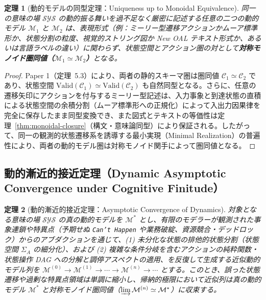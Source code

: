 \documentclass[11pt,a4paper]{ltjsarticle}
\theoremstyle{definition}
\theoremstyle{plain}
\newtheorem{theorem}{定理}[section]
\theoremstyle{remark}
\newcommand{\Valid}{\mathrm{Valid}}
\begin{document}
\begin{theorem}[動的モデルの同型定理：Uniqueness up to Monoidal Equivalence]\label{thm:dyn-iso}
同一の意味の場 $\mathcal{SYS}$ の動的振る舞いを過不足なく厳密に記述する任意の二つの動的モデル $\mathcal{M}_1$ と $\mathcal{M}_2$ は、表現形式（例：ミーリー型遷移アクションかムーア標準形か、状態分割の粒度、視覚的ストリング図か New OAL テキスト形式か、あるいは言語ラベルの違い）に関わらず、状態空間とアクション圏の対として\textbf{対称モノイド圏同値（$\mathcal{M}_1 \simeq \mathcal{M}_2$）}となる。
\end{theorem}

\begin{proof}
Paper 1（定理~5.3）により、両者の静的スキーマ圏は圏同値 $\mathcal{C}_1 \simeq \mathcal{C}_2$ であり、状態空間 $\Valid(\mathcal{C}_1) \simeq \Valid(\mathcal{C}_2)$ も自然同型となる。さらに、任意の遷移矢印にアクションを付与するミーリー型記述は、入力事象と到達状態の直積による状態空間の余積分割（ムーア標準形への正規化）によって入出力因果律を完全に保存したまま同型変換でき、また図式とテキストの等価性は定理~\ref{thm:monoidal-closure}（構文・意味論同型）により保証される。したがって、同一の観測的状態遷移系を誘導する最小実現（Minimal Realization）の普遍性により、両者の動的モデル圏は対称モノイド関手によって圏同値となる。
\end{proof}

\subsection{動的漸近的接近定理（Dynamic Asymptotic Convergence under Cognitive Finitude）}

\begin{theorem}[動的漸近的接近定理：Asymptotic Convergence of Dynamics]\label{thm:dyn-conv}
対象となる意味の場 $\mathcal{SYS}$ の真の動的モデルを $\mathcal{M}^*$ とし、有限のモデラーが観測された事象連鎖や特異点（予期せぬ \texttt{Can't Happen} や業務破綻、資源競合・デッドロック）からのアブダクションを通じて、(1) 未分化な状態の排他的状態分割（状態空間 $\Sigma_A$ の細分化）、および (2) 複雑な条件分岐を含むアクションの純粋関数・状態操作 DAG への分解と調停アスペクトの適用、を反復して生成する近似動的モデル列を $\mathcal{M}^{(0)} \to \mathcal{M}^{(1)} \to \cdots \to \mathcal{M}^{(n)} \to \cdots$ とする。このとき、誤った状態遷移や過剰な特異点領域は単調に縮小し、帰納的極限において近似列は真の動的モデル $\mathcal{M}^*$ と対称モノイド圏同値（$\varinjlim \mathcal{M}^{(n)} \simeq \mathcal{M}^*$）に収束する。
\end{theorem}
\end{document}
